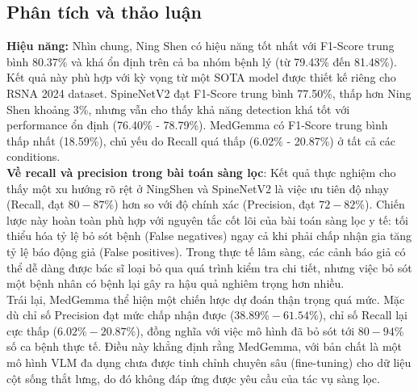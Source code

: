 \subsection{Phân tích và thảo luận}

\textbf{Hiệu năng: }Nhìn chung, Ning Shen có hiệu năng tốt nhất với F1-Score trung bình 80.37\% và khá ổn định trên cả ba nhóm bệnh lý (từ 79.43\% đến 81.48\%). Kết quả này phù hợp với kỳ vọng từ một SOTA model được thiết kế riêng cho RSNA 2024 dataset. SpineNetV2 đạt F1-Score trung bình 77.50\%, thấp hơn Ning Shen khoảng 3\%, nhưng vẫn cho thấy khả năng detection khá tốt với performance ổn định (76.40\% - 78.79\%). MedGemma có F1-Score trung bình thấp nhất (18.59\%), chủ yếu do Recall quá thấp (6.02\% - 20.87\%) ở tất cả các conditions. \\

\textbf{Về recall và precision trong bài toán sàng lọc}: 
Kết quả thực nghiệm cho thấy một xu hướng rõ rệt ở NingShen và SpineNetV2 là việc ưu tiên độ nhạy (Recall, đạt $80-87\%$) hơn so với độ chính xác (Precision, đạt $72-82\%$). Chiến lược này hoàn toàn phù hợp với nguyên tắc cốt lõi của bài toán sàng lọc y tế: tối thiểu hóa tỷ lệ bỏ sót bệnh (False negatives) ngay cả khi phải chấp nhận gia tăng tỷ lệ báo động giả (False positives). Trong thực tế lâm sàng, các cảnh báo giả có thể dễ dàng được bác sĩ loại bỏ qua quá trình kiểm tra chi tiết, nhưng việc bỏ sót một bệnh nhân có bệnh lại gây ra hậu quả nghiêm trọng hơn nhiều.\\

Trái lại, MedGemma thể hiện một chiến lược dự đoán thận trọng quá mức. Mặc dù chỉ số Precision đạt mức chấp nhận được ($38.89\% - 61.54\%$), chỉ số Recall lại cực thấp ($6.02\% - 20.87\%$), đồng nghĩa với việc mô hình đã bỏ sót tới $80-94\%$ số ca bệnh thực tế. Điều này khẳng định rằng MedGemma, với bản chất là một mô hình VLM đa dụng chưa được tinh chỉnh chuyên sâu (fine-tuning) cho dữ liệu cột sống thắt lưng, do đó không đáp ứng được yêu cầu của tác vụ sàng lọc.\\



